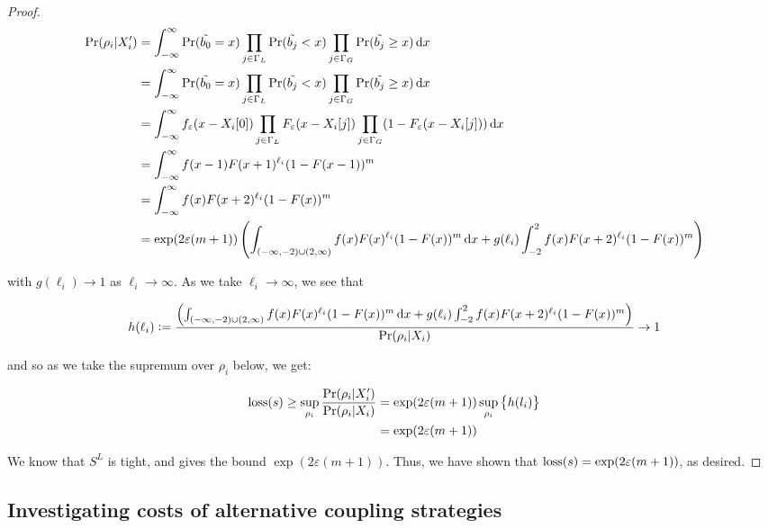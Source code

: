 \documentclass{article}
\renewcommand{\epsilon}{\varepsilon}
\newcommand{\loss}{\textup{loss}}
\newcommand{\1}{\langle 1 \rangle}
\newcommand{\2}{\langle 2 \rangle}
\begin{document}
\begin{proof}
    \begin{align*}
        \Pr(\rho_i | X_i') &= \int_{-\infty}^\infty \Pr(\tilde{b_0} = x) \prod_{j \in \Gamma_L} \Pr(\tilde{b_j} < x) \prod_{j \in \Gamma_G} \Pr(\tilde{b_j} \geq x) \dif x\\
        &= \int_{-\infty}^\infty \Pr(\tilde{b_0} = x) \prod_{j \in \Gamma_L} \Pr(\tilde{b_j} < x) \prod_{j \in \Gamma_G} \Pr(\tilde{b_j} \geq x) \dif x\\
        &= \int_{-\infty}^\infty f_\epsilon(x - X_i[0]) \prod_{j \in \Gamma_L} F_\epsilon(x - X_i[j]) \prod_{j \in \Gamma_G} (1 - F_\epsilon(x - X_i[j])) \dif x\\
        &= \int_{-\infty}^\infty f(x - 1) F(x + 1)^{\ell_i}  (1 - F(x - 1))^m \\
        &= \int_{-\infty}^\infty f(x) F(x + 2)^{\ell_i}  (1 - F(x))^m \\
        &= \exp(2\epsilon (m + 1) )\left(\int_{(-\infty, -2) \cup (2, \infty)} f(x) F(x)^{\ell_i}  (1 - F(x))^m \dif x + g(\ell_i) \int_{-2}^2 f(x) F(x + 2)^{\ell_i}  (1 - F(x))^m\right)
    \end{align*}

    with $g(\ell_i) \to 1$ as $\ell_i \to \infty$. As we take $\ell_i \to \infty$, we see that 

    \begin{align*}
        h(\ell_i) := \frac{\left(\int_{(-\infty, -2) \cup (2, \infty)} f(x) F(x)^{\ell_i}  (1 - F(x))^m \dif x + g(\ell_i) \int_{-2}^2 f(x) F(x + 2)^{\ell_i}  (1 - F(x))^m\right)}{\Pr(\rho_i | X_i)} \to 1
    \end{align*}

    and so as we take the supremum over $\rho_i$ below, we get: 

    \begin{align*}
        \loss(s) \geq \sup_{\rho_i} \frac{\Pr(\rho_i | X_i')}{\Pr(\rho_i | X_i)} &= \exp(2\epsilon(m + 1)) \sup_{\rho_i} \left\{ h(l_i) \right\}\\
        &= \exp(2\epsilon(m + 1))
    \end{align*}

    We know that $S^L$ is tight, and gives the bound $\exp(2\epsilon(m + 1))$. Thus, we have shown that $\loss(s) = \exp(2\epsilon(m + 1))$, as desired.
\end{proof}

\subsection{Investigating costs of alternative coupling strategies}
\end{document}
